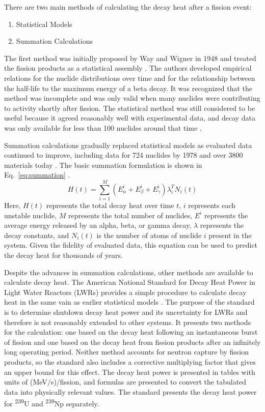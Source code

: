 \documentclass{anstrans}
\begin{document}
There are two main methods of calculating the decay heat after a fission event:
\begin{enumerate}
\item Statistical Models
\item Summation Calculations
\end{enumerate}
The first method was initially proposed by Way and Wigner in 1948 and treated the fission products as a statistical assembly \cite{Way1948}. The authors developed empirical relations for the nuclide distributions over time and for the relationship between the half-life to the maximum energy of a beta decay. It was recognized that the method was incomplete and was only valid when many nuclides were contributing to activity shortly after fission. The statistical method was still considered to be useful because it agreed reasonably well with experimental data, and decay data was only available for less than 100 nuclides around that time \cite{Tobi1980}. 

Summation calculations gradually replaced statistical models as evaluated data continued to improve, including data for 724 nuclides by 1978 \cite{Tobi1980} and over 3800 materials today \cite{Chad2011}. The basic summation formulation is shown in Eq.~\eqref{eq:summation} \cite{Nich2002}.
\begin{equation} \label{eq:summation} 
H(t) = \sum_{i=1}^{M} (E^i_\alpha + E^i_\beta + E^i_\gamma)\lambda^T_i N_i(t)
\end{equation}
Here, $H(t)$ represents the total decay heat over time $t$, $i$ represents each unstable nuclide, $M$ represents the total number of nuclides, $E^i$ represents the average energy released by an alpha, beta, or gamma decay, $\lambda$ represents the decay constants, and $N_i(t)$ is the number of atoms of nuclide $i$ present in the system. Given the fidelity of evaluated data, this equation can be used to predict the decay heat for thousands of years.

Despite the advances in summation calculations, other methods are available to calculate decay heat. The American National Standard for Decay Heat Power in Light Water Reactors (LWRs) provides a simple procedure to calculate decay heat in the same vain as earlier statistical models \cite{ansi2005}. The purpose of the standard is to determine shutdown decay heat power and its uncertainty for LWRs and therefore is not reasonably extended to other systems. It presents two methods for the calculation: one based on the decay heat following an instantaneous burst of fission and one based on the decay heat from fission products after an infinitely long operating period. Neither method accounts for neutron capture by fission products, so the standard also includes a corrective multiplying factor that gives an upper bound for this effect. The decay heat power is presented in tables with units of (MeV/s)/fission, and formulas are presented to convert the tabulated data into physically relevant values. The standard presents the decay heat power for \textsuperscript{239}U and \textsuperscript{239}Np separately.
\end{document}
